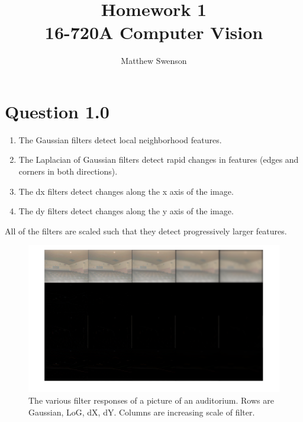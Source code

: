 \documentclass[11pt]{article}
\title{Homework 1\\ \vspace{2mm}\Large{16-720A Computer Vision }}
\author{Matthew Swenson}
\begin{document}
	\maketitle
	
\section{Question 1.0}
    \begin{enumerate}
    \item The Gaussian filters detect local neighborhood features. 
    \item The Laplacian of Gaussian filters detect rapid changes in features (edges and corners in both directions). 
    \item The dx filters detect changes along the x axis of the image. 
    \item The dy filters detect changes along the y axis of the image. 
    \end{enumerate}
    All of the filters are scaled such that they detect progressively larger features. 
\begin{figure}[ht]
\centering
\includegraphics[width=1.0\textwidth]{filter_responses.png}
\caption{The various filter responses of a picture of an auditorium. Rows are Gaussian, LoG, dX, dY.
Columns are increasing scale of filter. }
\end{figure}
\end{document}
